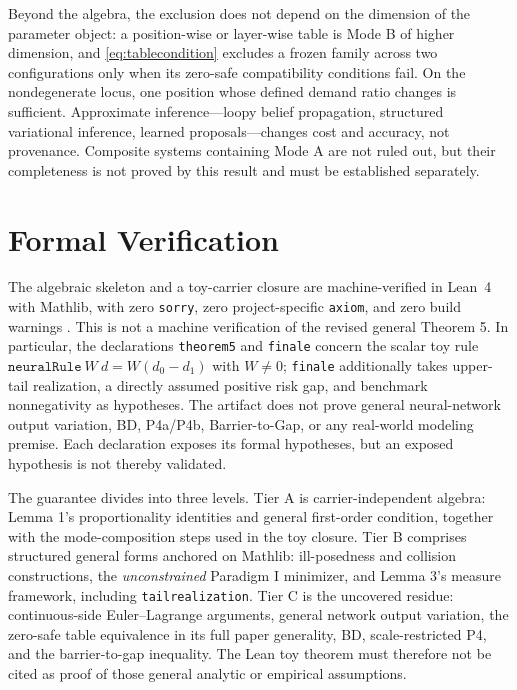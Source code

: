 \documentclass[twoside,11pt]{article}
\newcommand{\ttu}{\textunderscore\allowbreak}
\begin{document}
Beyond the algebra, the exclusion does not depend on the dimension of the parameter object: a position-wise or layer-wise table is Mode B of higher dimension, and \eqref{eq:tablecondition} excludes a frozen family across two configurations only when its zero-safe compatibility conditions fail. On the nondegenerate locus, one position whose defined demand ratio changes is sufficient. Approximate inference---loopy belief propagation, structured variational inference, learned proposals---changes cost and accuracy, not provenance. Composite systems containing Mode A are not ruled out, but their completeness is not proved by this result and must be established separately.

\section{Formal Verification}
\label{ch:verify}

The algebraic skeleton and a toy-carrier closure are machine-verified in Lean~4 with Mathlib, with zero \texttt{sorry}, zero project-specific \texttt{axiom}, and zero build warnings \citep{yang2023}. This is not a machine verification of the revised general Theorem 5. In particular, the declarations \texttt{theorem5} and \texttt{finale} concern the scalar toy rule $\texttt{neuralRule}\ W\ d=W(d_0-d_1)$ with $W\neq0$; \texttt{finale} additionally takes upper-tail realization, a directly assumed positive risk gap, and benchmark nonnegativity as hypotheses. The artifact does not prove general neural-network output variation, BD, P4a/P4b, Barrier-to-Gap, or any real-world modeling premise. Each declaration exposes its formal hypotheses, but an exposed hypothesis is not thereby validated.

The guarantee divides into three levels. Tier A is carrier-independent algebra: Lemma 1's proportionality identities and general first-order condition, together with the mode-composition steps used in the toy closure. Tier B comprises structured general forms anchored on Mathlib: ill-posedness and collision constructions, the \emph{unconstrained} Paradigm I minimizer, and Lemma 3's measure framework, including \texttt{tail\ttu realization}. Tier C is the uncovered residue: continuous-side Euler--Lagrange arguments, general network output variation, the zero-safe table equivalence in its full paper generality, BD, scale-restricted P4, and the barrier-to-gap inequality. The Lean toy theorem must therefore not be cited as proof of those general analytic or empirical assumptions.
\end{document}
